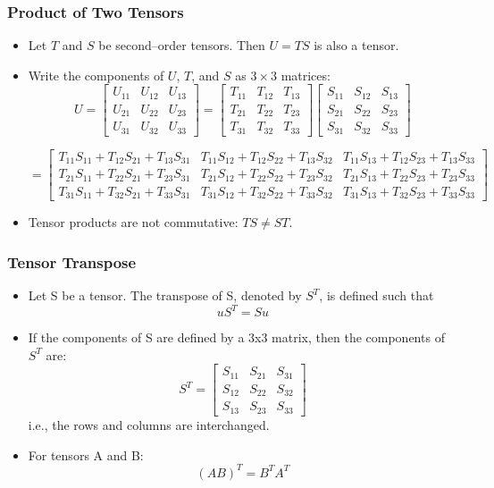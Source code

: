 \documentclass{beamer}
\begin{document}
\begin{frame}
\frametitle{Product of Two Tensors}
\small
\begin{itemize}
    \item Let $T$ and $S$ be second–order tensors. Then $U = TS$ is also a tensor.
    \item Write the components of $U$, $T$, and $S$ as $3\times 3$ matrices:
\[
U =
\begin{bmatrix}
U_{11} & U_{12} & U_{13} \\
U_{21} & U_{22} & U_{23} \\
U_{31} & U_{32} & U_{33}
\end{bmatrix}
=
\begin{bmatrix}
T_{11} & T_{12} & T_{13} \\
T_{21} & T_{22} & T_{23} \\
T_{31} & T_{32} & T_{33}
\end{bmatrix}
\begin{bmatrix}
S_{11} & S_{12} & S_{13} \\
S_{21} & S_{22} & S_{23} \\
S_{31} & S_{32} & S_{33}
\end{bmatrix}
\]

\vspace{-2mm}
\tiny
\[
= \begin{bmatrix}
T_{11}S_{11} + T_{12}S_{21} + T_{13}S_{31} &
T_{11}S_{12} + T_{12}S_{22} + T_{13}S_{32} &
T_{11}S_{13} + T_{12}S_{23} + T_{13}S_{33} \\
T_{21}S_{11} + T_{22}S_{21} + T_{23}S_{31} &
T_{21}S_{12} + T_{22}S_{22} + T_{23}S_{32} &
T_{21}S_{13} + T_{22}S_{23} + T_{23}S_{33} \\
T_{31}S_{11} + T_{32}S_{21} + T_{33}S_{31} &
T_{31}S_{12} + T_{32}S_{22} + T_{33}S_{32} &
T_{31}S_{13} + T_{32}S_{23} + T_{33}S_{33}
\end{bmatrix}
\]
\small
    \item Tensor products are not commutative: $TS \neq ST$.
\end{itemize}
\end{frame}


\begin{frame}
\frametitle{Tensor Transpose}
\begin{itemize}
    \item Let S be a tensor. The transpose of S, denoted by \(S^T\), is defined such that
    \[
    u S^T = S u
    \]
    \item If the components of S are defined by a 3x3 matrix, then the components of \(S^T\) are: 
    \[
    S^T =
    \begin{bmatrix}
        S_{11} & S_{21} & S_{31} \\
        S_{12} & S_{22} & S_{32} \\
        S_{13} & S_{23} & S_{33}
    \end{bmatrix}
    \]
    i.e., the rows and columns are interchanged. 
    \item For tensors A and B: 
    \[
    (A B)^T = B^T A^T
    \]
\end{itemize}
\end{frame}
\end{document}
